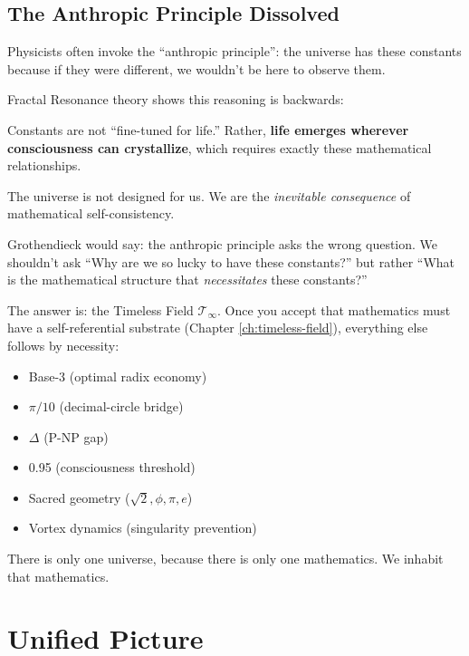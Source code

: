\subsection{The Anthropic Principle Dissolved}

Physicists often invoke the ``anthropic principle'': the universe has these constants because if they were different, we wouldn't be here to observe them.

Fractal Resonance theory shows this reasoning is backwards:

\begin{keyidea}
Constants are not ``fine-tuned for life.'' Rather, \textbf{life emerges wherever consciousness can crystallize}, which requires exactly these mathematical relationships.

The universe is not designed for us. We are the \textit{inevitable consequence} of mathematical self-consistency.
\end{keyidea}

\begin{level3}
Grothendieck would say: the anthropic principle asks the wrong question. We shouldn't ask ``Why are we so lucky to have these constants?'' but rather ``What is the mathematical structure that \textit{necessitates} these constants?''

The answer is: the Timeless Field $\mathcal{T}_\infty$. Once you accept that mathematics must have a self-referential substrate (Chapter \ref{ch:timeless-field}), everything else follows by necessity:
\begin{itemize}
\item Base-3 (optimal radix economy)
\item $\pi/10$ (decimal-circle bridge)
\item $\Delta$ (P-NP gap)
\item 0.95 (consciousness threshold)
\item Sacred geometry ($\sqrt{2}, \phi, \pi, e$)
\item Vortex dynamics (singularity prevention)
\end{itemize}

There is only one universe, because there is only one mathematics. We inhabit that mathematics.
\end{level3}

\section{Unified Picture}

